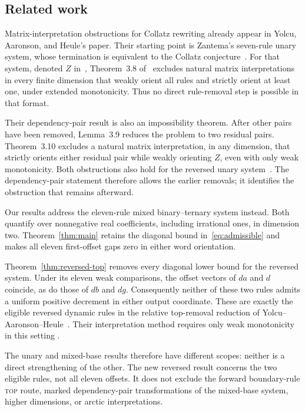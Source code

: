 \documentclass[11pt,a4paper]{article}
\begin{document}
\subsection{Related work}
Matrix-interpretation obstructions for Collatz rewriting already appear
in Yolcu, Aaronson, and Heule's paper. Their starting point is Zantema's
seven-rule unary system, whose termination is equivalent to the Collatz
conjecture~\cite[Section~10, Theorem~16]{zantema}. For that system,
denoted $Z$ in~\cite{yah}, Theorem~3.8 of~\cite{yah} excludes natural
matrix interpretations in every finite dimension that weakly orient all
rules and strictly orient at least one, under extended monotonicity.
Thus no direct rule-removal step is possible in that format.

Their dependency-pair result is also an impossibility theorem. After
other pairs have been removed, Lemma~3.9 reduces the problem to two
residual pairs. Theorem~3.10 excludes a natural matrix interpretation,
in any dimension, that strictly orients either residual pair while
weakly orienting $Z$, even with only weak monotonicity. Both obstructions
also hold for the reversed unary system~\cite[Section~3.1.1]{yah}.
The dependency-pair statement therefore allows the earlier removals;
it identifies the obstruction that remains afterward.

Our results address the eleven-rule mixed binary--ternary system
instead. Both quantify over nonnegative real coefficients, including
irrational ones, in dimension two. Theorem~\ref{thm:main} retains the
diagonal bound in~\eqref{eq:admissible} and makes all eleven
first-offset gaps zero in either word orientation.

Theorem~\ref{thm:reversed-top} removes every diagonal lower bound for the reversed
system. Under its eleven weak comparisons, the offset vectors of
$da$ and $d$ coincide, as do those of $db$ and $dg$. Consequently
neither of these two rules admits a uniform positive decrement in
either output coordinate. These are exactly the eligible reversed
dynamic rules in the relative top-removal reduction of
Yolcu--Aaronson--Heule~\cite[Lemma~3.18(2)]{yah}. Their interpretation
method requires only weak monotonicity in this setting
\cite[Theorem~2.15]{yah}.

The unary and mixed-base results therefore have different scopes:
neither is a direct strengthening of the other. The new reversed
result concerns the two eligible rules, not all eleven offsets. It
does not exclude the forward boundary-rule \textsc{top} route, marked
dependency-pair transformations of the mixed-base system, higher
dimensions, or arctic interpretations.
\end{document}
